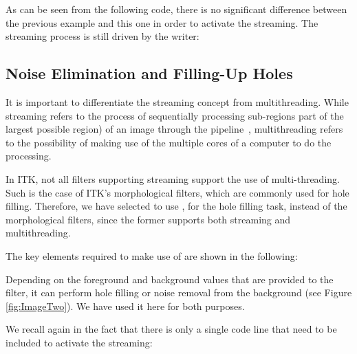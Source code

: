 \documentclass{InsightArticle}
\begin{document}
\begin{center}

\end{center}

As can be seen from the following code, there is no significant difference
between the previous example and this one in order to activate the streaming.
The streaming process is still driven by the writer:

\begin{center}

\end{center}

\subsection{Noise Elimination and Filling-Up Holes}
It is important to differentiate the streaming concept from multithreading. While
streaming refers to the process of sequentially processing sub-regions part of
the largest possible region) of an image through the pipeline~\cite{Lowekamp2010},
multithreading refers to the possibility of making use of the multiple cores of
a computer to do the processing.

In ITK, not all filters supporting streaming support the use of multi-threading.
Such is the case of ITK's morphological filters, which are commonly used for hole
filling. Therefore, we have selected to use ,
for the hole filling task, instead of the morphological filters, since the former
supports both streaming and multithreading.

The key elements required to make use of  
are shown in the following:

\begin{center}

\end{center}

Depending on the foreground and background values that are provided to the
filter, it can perform hole filling or noise removal from the background (see
Figure \ref{fig:ImageTwo}).  We have used it here for both purposes.

We recall again in the fact that there is only a single code line that
need to be included to activate the streaming:

\begin{center}

\end{center}
\end{document}
